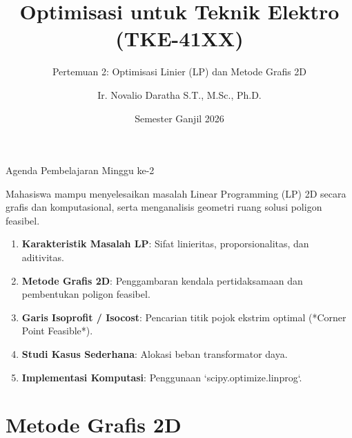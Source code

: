 \documentclass[10pt,aspectratio=169]{beamer}
\title[Optimisasi TE: Pertemuan 2]{Optimisasi untuk Teknik Elektro (TKE-41XX)}
\subtitle{Pertemuan 2: Optimisasi Linier (LP) dan Metode Grafis 2D}
\author[N. Daratha]{Ir. Novalio Daratha S.T., M.Sc., Ph.D.}
\institute[Teknik Elektro UNIB]{Program Studi S1 Teknik Elektro\\Fakultas Teknik --- Universitas Bengkulu}
\date{Semester Ganjil 2026}
\begin{document}
\begin{frame}
    \titlepage
\end{frame}

\begin{frame}{Agenda Pembelajaran Minggu ke-2}
    \begin{tcolorbox}[colback=unibblue!5,colframe=unibblue,title=\textbf{Tujuan Pembelajaran (Sub-CPMK 2)}]
        Mahasiswa mampu menyelesaikan masalah Linear Programming (LP) 2D secara grafis dan komputasional, serta menganalisis geometri ruang solusi poligon feasibel.
    \end{tcolorbox}

    \vspace{0.3cm}
    \begin{enumerate}
        \item \textbf{Karakteristik Masalah LP}: Sifat linieritas, proporsionalitas, dan aditivitas.
        \item \textbf{Metode Grafis 2D}: Penggambaran kendala pertidaksamaan dan pembentukan poligon feasibel.
        \item \textbf{Garis Isoprofit / Isocost}: Pencarian titik pojok ekstrim optimal (*Corner Point Feasible*).
        \item \textbf{Studi Kasus Sederhana}: Alokasi beban transformator daya.
        \item \textbf{Implementasi Komputasi}: Penggunaan `scipy.optimize.linprog`.
    \end{enumerate}
\end{frame}

\section{Metode Grafis 2D}
\end{document}
